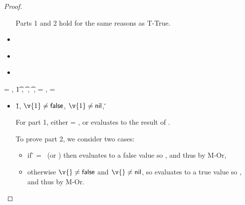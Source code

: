\begin{lemma}
\begin{proof}
\begin{case}[T-AssocHMap]
\begin{itemize}
\begin{subcase}[B-Assoc]
        Parts 1 and 2 hold for the same reasons as T-True.
      \end{subcase}
    \item[]
      \begin{subcase}[BE-Assoc1]
      \end{subcase}
    \item[]
      \begin{subcase}[BE-Assoc2]
      \end{subcase}
    \item[]
      \begin{subcase}[BE-Assoc3]
      \end{subcase}
  \end{itemize}
\end{case}

\begin{case}[T-If] \e{} = { {} {}},
  \judgement {\propenv{}} { {\t{1}}} { {}}
                 {},
                 { {\t{}}} { {}}
                 {\object{}},
                 { {\t{}}} { {}}
                 {\object{}},
  \thenprop{\prop{}} = { {}},
  \elseprop{\prop{}} = { {}}

  \begin{itemize}
    \item[]
      \begin{subcase}[B-IfTrue]
        \opsem {\openv{}} {} {\v{1}},
              ${\v{1}} \not= {\false}$,
              ${\v{1}} \not= {\nil}$,
              \opsem {\openv{}} {} {\v{}}

              For part 1, either \object{} = \emptyobject{}, or \e{} evaluates to the
              result of .

              To prove part 2, we consider two cases:
              \begin{itemize}
                \item if \v{} = \false\ (or \nil)
                  then  evaluates to a false value so {}, and thus
                  {} by M-Or, 
                \item otherwise
                  ${\v{}} \not= {\false}$ and
                  ${\v{}} \not= {\nil}$,
                  so  evaluates to a true value so {}, and thus
                  {} by M-Or.
              \end{itemize}


\end{subcase}
\end{itemize}
\end{case}
\end{proof}
\end{lemma}
